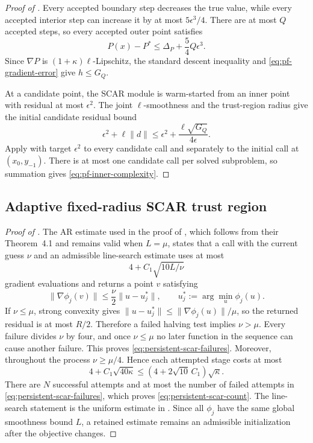 \documentclass{article}
\begin{document}
\begin{proof}[Proof of ]
Every accepted boundary step decreases the true value, while every
accepted interior step can increase it by at most $5\epsilon^3/4$.
There are at most $Q$ accepted steps, so every accepted outer point
satisfies
\[
 P(x)-P^*\le\Delta_P+\frac54Q\epsilon^3.
\]
Since $\nabla P$ is $(1+\kappa)\ell$-Lipschitz, the standard descent
inequality and \eqref{eq:pf-gradient-error} give $h\le G_Q$.

At a candidate point, the SCAR module is warm-started from an inner point with
residual at most $\epsilon^2$.  The joint $\ell$-smoothness and the
trust-region radius give the initial candidate residual bound
\[
 \epsilon^2+\ell\|d\|
 \le\epsilon^2+\frac{\ell\sqrt{G_Q}}{4\epsilon}.
\]
Apply  with target $\epsilon^2$ to every candidate
call and separately to the initial call at $(x_0,y_{-1})$.  There is
at most one candidate call per solved subproblem, so summation gives
\eqref{eq:pf-inner-complexity}.
\end{proof}

\subsection{Adaptive fixed-radius SCAR trust region}

\begin{proof}[Proof of ]
The AR estimate used in the proof of
\citet[Theorem~5.1]{lan2026optimal}, which follows from their
Theorem~4.1 and remains valid when $L=\mu$, states that a call with the
current guess $\nu$ and an admissible line-search estimate uses at
most
\[
 4+C_1\sqrt{10L/\nu}
\]
gradient evaluations and returns a point $v$ satisfying
\[
 \|\nabla\phi_j(v)\|
 \le\frac\nu2\|u-u_j^*\|,
 \qquad u_j^*:=\arg\min_u\phi_j(u).
\]
If $\nu\le\mu$, strong convexity gives
$\|u-u_j^*\|\le\|\nabla\phi_j(u)\|/\mu$, so the returned residual is
at most $R/2$.  Therefore a failed halving test implies $\nu>\mu$.
Every failure divides $\nu$ by four, and once $\nu\le\mu$ no later
function in the sequence can cause another failure.  This proves
\eqref{eq:persistent-scar-failures}.  Moreover, throughout the process
$\nu\ge\mu/4$.  Hence each attempted stage costs at most
\[
 4+C_1\sqrt{40\kappa}
 \le(4+2\sqrt{10}\,C_1)\sqrt\kappa.
\]
There are $N$ successful attempts and at most the number of failed
attempts in \eqref{eq:persistent-scar-failures}, which proves
\eqref{eq:persistent-scar-count}.  The line-search statement is the
uniform estimate in .  Since all $\phi_j$ have
the same global smoothness bound $L$, a retained estimate remains an
admissible initialization after the objective changes.
\end{proof}
\end{document}
